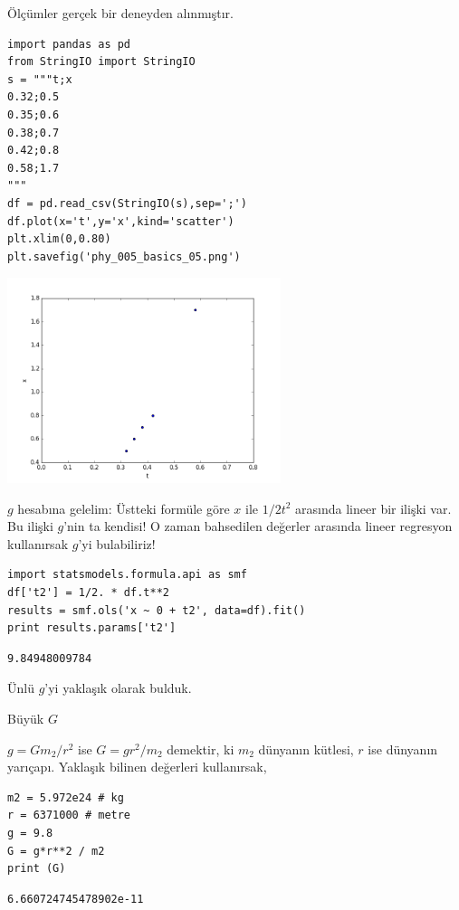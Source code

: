 \documentclass[12pt,fleqn]{article}\usepackage{../../common}
\begin{document}
Ölçümler gerçek bir deneyden alınmıştır.

\begin{verbatim}
import pandas as pd
from StringIO import StringIO
s = """t;x
0.32;0.5
0.35;0.6
0.38;0.7
0.42;0.8
0.58;1.7
"""
df = pd.read_csv(StringIO(s),sep=';')
df.plot(x='t',y='x',kind='scatter')
plt.xlim(0,0.80)
plt.savefig('phy_005_basics_05.png')
\end{verbatim}

\includegraphics[height=6cm]{phy_005_basics_05.png}

$g$ hesabına gelelim: Üstteki formüle göre $x$ ile $1/2 t^2$ arasında
lineer bir ilişki var. Bu ilişki $g$'nin ta kendisi! O zaman bahsedilen
değerler arasında lineer regresyon kullanırsak $g$'yi bulabiliriz!

\begin{verbatim}
import statsmodels.formula.api as smf
df['t2'] = 1/2. * df.t**2
results = smf.ols('x ~ 0 + t2', data=df).fit()
print results.params['t2']
\end{verbatim}

\begin{verbatim}
9.84948009784
\end{verbatim}

Ünlü $g$'yi yaklaşık olarak bulduk.

Büyük $G$

$g = Gm_2 / r^2$ ise $G = g r^2 / m_2$ demektir, ki $m_2$ dünyanın kütlesi, $r$
ise dünyanın yarıçapı. Yaklaşık bilinen değerleri kullanırsak,

\begin{verbatim}
m2 = 5.972e24 # kg
r = 6371000 # metre
g = 9.8
G = g*r**2 / m2
print (G)
\end{verbatim}

\begin{verbatim}
6.660724745478902e-11
\end{verbatim}
\end{document}
